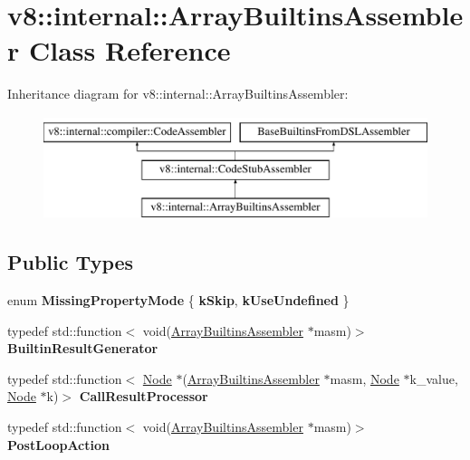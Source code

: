 \hypertarget{classv8_1_1internal_1_1ArrayBuiltinsAssembler}{}\section{v8\+:\+:internal\+:\+:Array\+Builtins\+Assembler Class Reference}
\label{classv8_1_1internal_1_1ArrayBuiltinsAssembler}
Inheritance diagram for v8\+:\+:internal\+:\+:Array\+Builtins\+Assembler\+:\begin{figure}[H]
\begin{center}
\leavevmode
\includegraphics[height=3.000000cm]{classv8_1_1internal_1_1ArrayBuiltinsAssembler}
\end{center}
\end{figure}
\subsection*{Public Types}
\begin{DoxyCompactItemize}
\item 
\mbox{\label{classv8_1_1internal_1_1ArrayBuiltinsAssembler_a3e3cd1d1690fd5273292cb659b76132e}} 
enum {\bfseries Missing\+Property\+Mode} \{ {\bfseries k\+Skip}, 
{\bfseries k\+Use\+Undefined}
 \}
\item 
\mbox{\label{classv8_1_1internal_1_1ArrayBuiltinsAssembler_a7e92511b4ae9451c9d9515fe0a2981d3}} 
typedef std\+::function$<$ void(\mbox{\hyperlink{classv8_1_1internal_1_1ArrayBuiltinsAssembler}{Array\+Builtins\+Assembler}} $\ast$masm)$>$ {\bfseries Builtin\+Result\+Generator}
\item 
\mbox{\label{classv8_1_1internal_1_1ArrayBuiltinsAssembler_a67e32d49658989e3b831aa5f4b1e1aa1}} 
typedef std\+::function$<$ \mbox{\hyperlink{classv8_1_1internal_1_1compiler_1_1Node}{Node}} $\ast$(\mbox{\hyperlink{classv8_1_1internal_1_1ArrayBuiltinsAssembler}{Array\+Builtins\+Assembler}} $\ast$masm, \mbox{\hyperlink{classv8_1_1internal_1_1compiler_1_1Node}{Node}} $\ast$k\+\_\+value, \mbox{\hyperlink{classv8_1_1internal_1_1compiler_1_1Node}{Node}} $\ast$k)$>$ {\bfseries Call\+Result\+Processor}
\item 
\mbox{\label{classv8_1_1internal_1_1ArrayBuiltinsAssembler_a7d8abde851d7aa80e9326670766c1e6e}} 
typedef std\+::function$<$ void(\mbox{\hyperlink{classv8_1_1internal_1_1ArrayBuiltinsAssembler}{Array\+Builtins\+Assembler}} $\ast$masm)$>$ {\bfseries Post\+Loop\+Action}
\end{DoxyCompactItemize}
